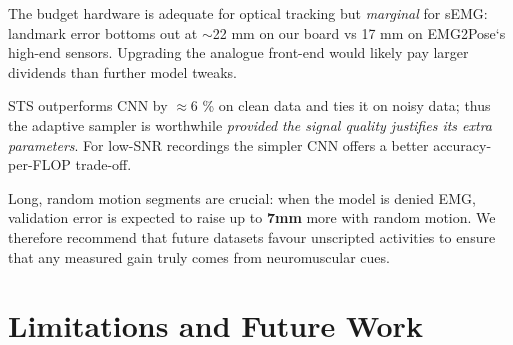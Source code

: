\begin{description}[style=unboxed,leftmargin=0pt]

\item[\textbf{RQ-A}]
      The budget hardware is adequate for optical tracking but \emph{marginal}
      for sEMG: landmark error bottoms out at \(\sim\)22 mm on our board vs
      17 mm on EMG2Pose`s high-end sensors. Upgrading the analogue front-end
      would likely pay larger dividends than further model tweaks.

\item[\textbf{RQ-B}]
      STS outperforms CNN by \(\approx\)6 \% on clean data and ties it on noisy
      data; thus the adaptive sampler is worthwhile \emph{provided the signal
      quality justifies its extra parameters}. For low-SNR recordings the
      simpler CNN offers a better accuracy-per-FLOP trade-off.

\item[\textbf{RQ-C}]
      Long, random motion segments are crucial: when the model is denied EMG,
      validation error is expected to raise up to \textbf{7mm} more with random motion.
      We therefore recommend that future datasets favour unscripted activities
      to ensure that any measured gain truly comes from neuromuscular cues.

\end{description}

\section{Limitations and Future Work}

